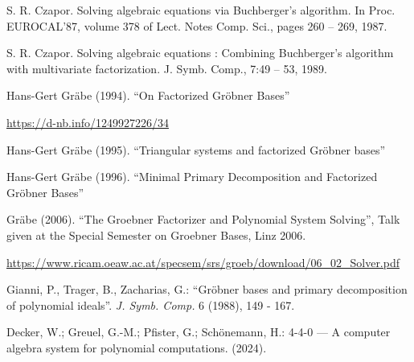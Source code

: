 \documentclass{article}
\begin{document}
\vfill\eject
\begin{thebibliography}{9}

S. R. Czapor. Solving algebraic equations via Buchberger’s algorithm. In Proc. EUROCAL’87,
volume 378 of Lect. Notes Comp. Sci., pages 260 -- 269, 1987.

S. R. Czapor. Solving algebraic equations : Combining Buchberger’s algorithm with
multivariate factorization. J. Symb. Comp., 7:49 -- 53, 1989.

Hans-Gert Gr\"abe (1994). ``On Factorized Gr\"obner Bases''

\url{https://d-nb.info/1249927226/34}

Hans-Gert Gr\"abe (1995). ``Triangular systems and factorized Gr\"obner bases''

Hans-Gert Gr\"abe (1996). ``Minimal Primary Decomposition and Factorized Gr\"obner Bases''

Gr\"abe (2006).  ``The Groebner Factorizer and Polynomial System Solving'',
Talk given at the Special Semester on Groebner Bases, Linz 2006.

\url{https://www.ricam.oeaw.ac.at/specsem/srs/groeb/download/06_02_Solver.pdf}

Gianni, P., Trager, B., Zacharias, G.: ``Gr\"obner bases and primary decomposition of polynomial ideals''.
{\it J. Symb. Comp.} 6 (1988), 149 - 167.

Decker, W.; Greuel, G.-M.; Pfister, G.; Sch{\"o}nemann, H.:
 {4-4-0} --- {A} computer algebra system for polynomial computations.
 (2024).

\end{thebibliography}
\end{document}
